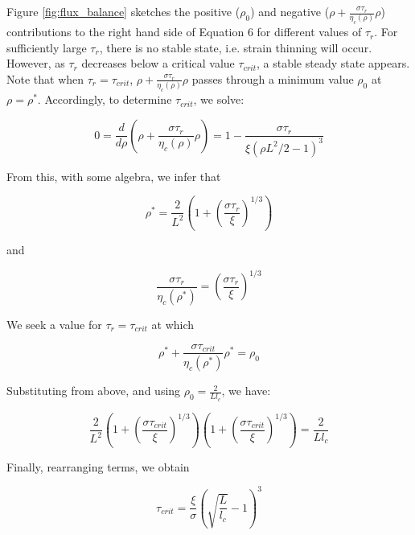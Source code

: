 Figure \ref{fig:flux_balance} sketches the positive ($\rho_0$) and negative ($\rho+\frac{\sigma \tau_r}{\eta_c(\rho)}\rho$) contributions to the right hand side of Equation 6 for different values of $\tau_r$. For sufficiently large $\tau_r$, there is no stable state, i.e. strain thinning will occur.  However, as $\tau_r$ decreases below a critical value $\tau_{crit}$, a stable steady state appears.  Note that when $\tau_r = \tau_{crit}$, $\rho+\frac{\sigma\tau_r}{\eta_c(\rho)}\rho$ passes through a minimum value $\rho_0$ at $\rho=\rho^*$.  Accordingly, to determine $\tau_{crit}$, we solve:

\begin{equation}
	\label{drho_3}
	0 = \frac{d}{d\rho}\left( \rho + \frac{\sigma\tau_r}{\eta_c(\rho)} \rho\right ) = 1 - \frac{\sigma\tau_r}{\xi (\rho L^2/2-1)^3}
\end{equation}

From this, with some algebra, we infer that

\begin{equation}
	\label{drho_4}
	\rho^* = \frac{2}{L^2}\left ( 1 + \left( \frac{\sigma\tau_r}{\xi}\right )^{1/3} \right )
\end{equation}

and 

\begin{equation}
	\label{drho_5}
	\frac{\sigma\tau_r}{\eta_c(\rho^*)} =  \left( \frac{\sigma\tau_r}{\xi}\right )^{1/3} 
\end{equation}

We seek a value for $\tau_r=\tau_{crit}$ at which


\begin{equation}
	\label{drho_6}
	\rho^* + \frac{\sigma\tau_{crit}}{\eta_c(\rho^*)}\rho^* =  \rho_0
\end{equation}

Substituting from above, and using $\rho_0=\frac{2}{L l_c}$, we have:

\begin{equation}
	\label{drho_7}
	\frac{2}{L^2}\left ( 1 + \left( \frac{\sigma\tau_{crit}}{\xi}\right )^{1/3}  \right )
	\left ( 1 + \left( \frac{\sigma\tau_{crit}}{\xi}\right )^{1/3}  \right )
	= \frac{2}{L l_c}
\end{equation}

Finally, rearranging terms, we obtain

\begin{equation}
	\label{drho_8}
	\tau_{crit}=\frac{\xi}{\sigma}\left( \sqrt{\frac{L}{l_c}}-1\right )^3
\end{equation}



